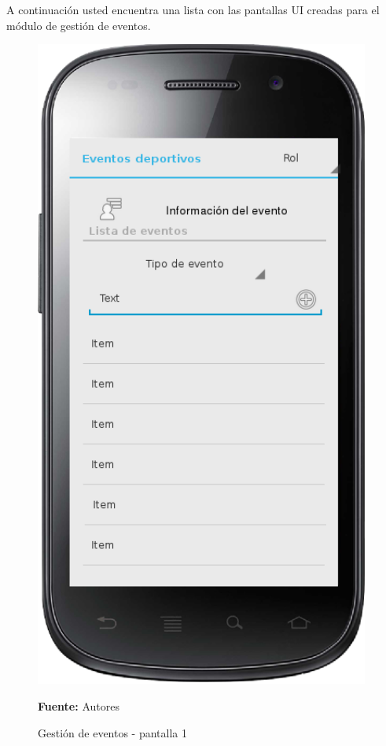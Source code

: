 A continuación usted encuentra una lista con las pantallas UI creadas para el módulo de gestión de eventos.

\begin{figure}[!htb]
  \begin{center}
    \includegraphics[width=11cm]{./imagenes/UI/Eventos/gestion_eventos_1.png}
    \caption{Gestión de eventos - pantalla 1}
    \label{fig:gestion_eventos_1}
    \textbf{Fuente:}  Autores
  \end{center}
\end{figure}

